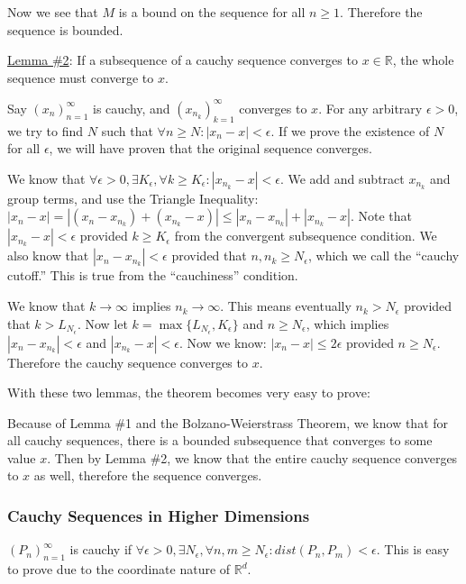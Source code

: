 \documentclass[11 pt, twoside]{article}
\begin{document}
Now we see that $M$ is a bound on the sequence for all $n \geq 1$. Therefore the
sequence is bounded.

\underline{Lemma \#2}: If a subsequence of a cauchy sequence converges to $x \in \mathbb{R}$, the
whole sequence must converge to $x$.

Say $(x_n)_{n=1}^\infty$ is cauchy, and $(x_{n_k})_{k = 1}^\infty$ converges to
$x$. For any arbitrary $\epsilon > 0$, we try to find $N$ such that $\forall
n \geq N: |x_n - x| < \epsilon$. If we prove the existence of $N$ for all
$\epsilon$, we will have proven that the original sequence converges.

We know that $\forall \epsilon > 0, \exists K_\epsilon, \forall k \geq
K_\epsilon: |x_{n_k} - x| < \epsilon$. We add and subtract $x_{n_k}$ and
group terms, and use the Triangle Inequality: $|x_n - x| = |(x_n - x_{n_k}) + (x_{n_k} - x)| \leq
|x_n - x_{n_k}| + |x_{n_k} - x|$. Note that $|x_{n_k} - x| < \epsilon$
provided $k \geq K_{\epsilon}$ from the convergent subsequence condition. We
also know that $|x_n - x_{n_k}| < \epsilon$ provided that $n, n_k \geq
N_{\epsilon}$, which we call the ``cauchy cutoff.'' This is true from the
``cauchiness'' condition.

We know that $k\to\infty$ implies $n_k \to \infty$. This means eventually
$n_k > N_\epsilon$ provided that $k > L_{N_\epsilon}$. Now let $k =
\max\{L_{N_\epsilon}, K_\epsilon\}$ and $n \geq N_\epsilon$, which
implies $|x_n - x_{n_k}| < \epsilon$ and $|x_{n_k} - x| < \epsilon$.
Now we know: $|x_n - x| \leq 2\epsilon$ provided $n \geq N_{\epsilon}$.
Therefore the cauchy sequence converges to $x$.

\vspace{0.3cm}

With these two lemmas, the theorem becomes very easy to prove:

Because of Lemma \#1 and the Bolzano-Weierstrass Theorem, we know that for all
cauchy sequences, there is a bounded subsequence that converges to some value
$x$. Then by Lemma \#2, we know that the entire cauchy sequence converges to $x$
as well, therefore the sequence converges. 

\subsubsection{Cauchy Sequences in Higher Dimensions}

$(P_n)_{n=1}^\infty$ is cauchy if $\forall \epsilon > 0, \exists N_\epsilon, \forall n, m \geq N_\epsilon: dist(P_n, P_m) < \epsilon$.
This is easy to prove due to the coordinate nature of $\mathbb{R}^d$.
\end{document}
